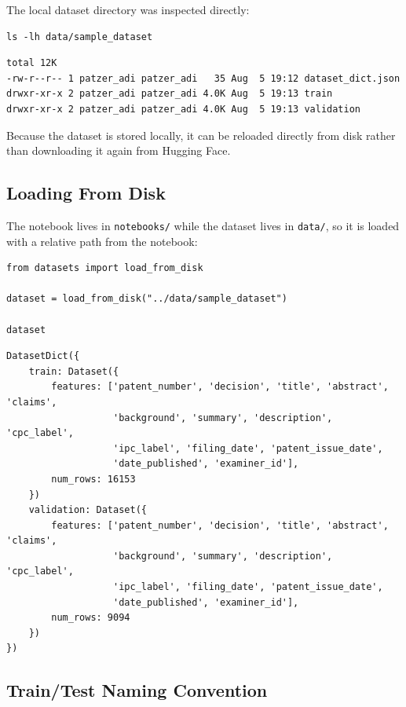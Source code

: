 \documentclass[11pt]{article}
\begin{document}
\noindent The local dataset directory was inspected directly:

\begin{lstlisting}
ls -lh data/sample_dataset
\end{lstlisting}

\begin{lstlisting}
total 12K
-rw-r--r-- 1 patzer_adi patzer_adi   35 Aug  5 19:12 dataset_dict.json
drwxr-xr-x 2 patzer_adi patzer_adi 4.0K Aug  5 19:13 train
drwxr-xr-x 2 patzer_adi patzer_adi 4.0K Aug  5 19:13 validation
\end{lstlisting}

\noindent Because the dataset is stored locally, it can be reloaded directly from disk rather than downloading it again from Hugging Face.

\subsection{Loading From Disk}
\label{sec:load-hupd-sample}

The notebook lives in \texttt{notebooks/} while the dataset lives in \texttt{data/}, so it is loaded with a relative path from the notebook:

\begin{lstlisting}
from datasets import load_from_disk

dataset = load_from_disk("../data/sample_dataset")

dataset
\end{lstlisting}

\begin{lstlisting}
DatasetDict({
    train: Dataset({
        features: ['patent_number', 'decision', 'title', 'abstract', 'claims',
                   'background', 'summary', 'description', 'cpc_label',
                   'ipc_label', 'filing_date', 'patent_issue_date',
                   'date_published', 'examiner_id'],
        num_rows: 16153
    })
    validation: Dataset({
        features: ['patent_number', 'decision', 'title', 'abstract', 'claims',
                   'background', 'summary', 'description', 'cpc_label',
                   'ipc_label', 'filing_date', 'patent_issue_date',
                   'date_published', 'examiner_id'],
        num_rows: 9094
    })
})
\end{lstlisting}

\subsection{Train/Test Naming Convention}
\end{document}
